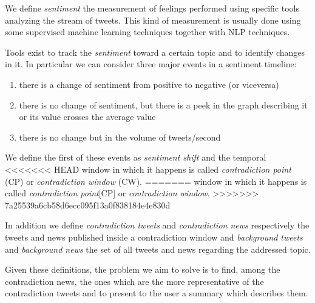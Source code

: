 We define \emph{sentiment} the measurement of feelings performed using specific
tools analyzing the stream of tweets. This kind of measurement is usually done
using some supervised machine learning techniques together with NLP techniques.

Tools exist to track the \emph{sentiment} toward a certain topic and to identify
changes in it. In particular we can consider three major events in a sentiment
timeline:
\begin{enumerate}
	\item there is a change of sentiment from positive to negative (or
		viceversa)
	\item there is no change of sentiment, but there is a peek in the graph
		describing it or its value crosses the average value
	\item there is no change but in the volume of tweets/second
\end{enumerate}
We define the first of these events as \emph{sentiment shift} and the temporal
<<<<<<< HEAD
window in which it happens is called \emph{contradiction point} (CP) or
\emph{contradiction window} (CW).
=======
window in which it happens is called \emph{contradiction point}[CP] or
\emph{contradiction window}.
>>>>>>> 7a25539a6cb58d6ecc095f13a0f838184e4e830d

In addition we define \emph{contradiction tweets} and \emph{contradiction news}
respectively the tweets and news published inside a contradiction window and
\emph{background tweets} and \emph{background news} the set of all tweets and
news regarding the addressed topic.

Given these definitions, the problem we aim to solve is to find, among the
contradiction news, the ones which are the more representative of the
contradiction tweets and to present to the user a summary which describes them.
